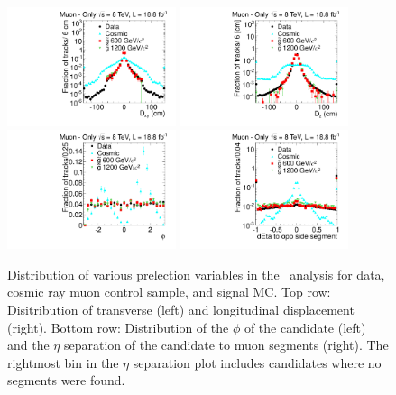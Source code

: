 \begin{figure}
\centering
  \includegraphics[clip=true, trim=0.0cm 0cm 2.8cm 0cm, width=0.44\textwidth]{figures/muonly/Selection_Comp_8TeV_Cosmic_Dxy_BS}
  \includegraphics[clip=true, trim=0.0cm 0cm 2.8cm 0cm, width=0.44\textwidth]{figures/muonly/Selection_Comp_8TeV_Cosmic_Dz_BS} \\
  \includegraphics[clip=true, trim=0.0cm 0cm 2.8cm 0cm, width=0.44\textwidth]{figures/muonly/Selection_Comp_8TeV_Cosmic_Phi_BS}
  \includegraphics[clip=true, trim=0.0cm 0cm 2.8cm 0cm, width=0.44\textwidth]{figures/muonly/Selection_Comp_8TeV_Cosmic_SegMinEtaSep_BS}
  \caption[Distribution of transverse and longitudinal displacement, $\phi$, and $\eta$ separation to muon segments
in the \muononly\ analysis for data, cosmic ray muon control sample, and signal MC.]
{Distribution of various prelection variables in the \muononly\ analysis for data, cosmic ray muon control sample, and signal MC.
Top row: Disitribution of transverse (left) and longitudinal displacement (right).
Bottom row: Distribution of the $\phi$ of the candidate (left) and the $\eta$ separation of the candidate to muon segments (right). The rightmost bin in the
$\eta$ separation plot includes candidates where no segments were found.}
    \label{fig:MuOnlyPreselC}
\end{figure}

